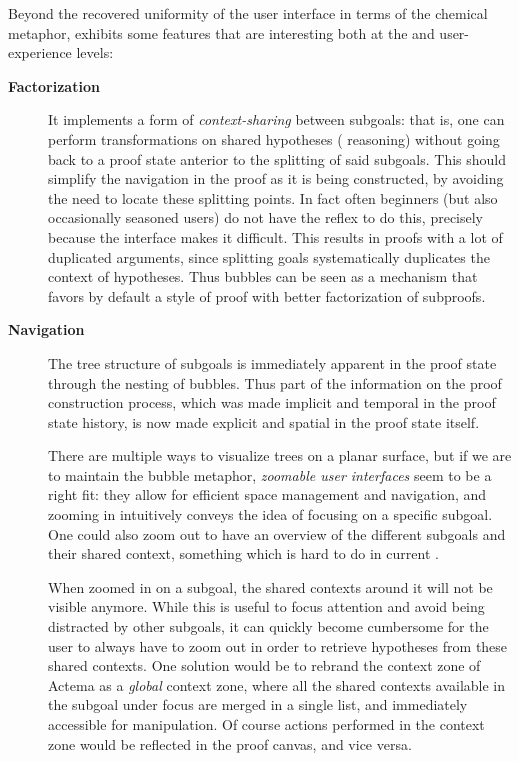 Beyond the recovered uniformity of the user interface in terms of the chemical
metaphor,  exhibits some features that are interesting both at the
 and user-experience levels:
\begin{description}
  \item[\textbf{Factorization}] It implements a form of \emph{context-sharing}
    between subgoals: that is, one can perform transformations on shared
    hypotheses ( reasoning) without going back to a proof state anterior
    to the splitting of said subgoals. This should simplify the navigation in
    the proof as it is being constructed, by avoiding the need to locate these
    splitting points. In fact often beginners (but also occasionally seasoned
    users) do not have the reflex to do this, precisely because the interface
    makes it difficult. This results in proofs with a lot of duplicated
    arguments, since splitting goals systematically duplicates the context of
    hypotheses. Thus bubbles can be seen as a mechanism that favors by default a
    style of proof with better factorization of
    subproofs.\label{par:factorization}

  \item[\textbf{Navigation}] The tree structure of subgoals is immediately
    apparent in the proof state through the nesting of bubbles. Thus part of the
    information on the proof construction process, which was made implicit and
    temporal in the proof state history, is now made explicit and spatial in the
    proof state itself.
    
    There are multiple ways to visualize trees on a planar surface, but if we
    are to maintain the bubble metaphor, \emph{zoomable user interfaces} seem to
    be a right fit: they allow for efficient space management and navigation,
    and zooming in intuitively conveys the idea of focusing on a specific
    subgoal. One could also zoom out to have an overview of the different
    subgoals and their shared context, something which is hard to do in current
    .
    
    When zoomed in on a subgoal, the shared contexts around it will not be
    visible anymore. While this is useful to focus attention and avoid being
    distracted by other subgoals, it can quickly become cumbersome for the user
    to always have to zoom out in order to retrieve hypotheses from these shared
    contexts. One solution would be to rebrand the context zone of Actema as a
    \emph{global} context zone, where all the shared contexts available in the
    subgoal under focus are merged in a single list, and immediately accessible
    for manipulation. Of course actions performed in the context zone would be
    reflected in the proof canvas, and vice versa.


\end{description}
